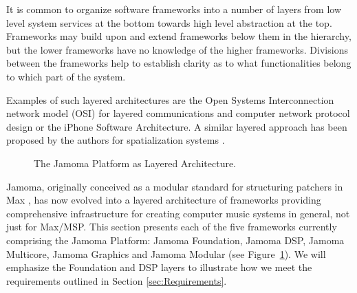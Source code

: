 \documentclass[twoside,10pt]{article}
\begin{document}
It is common to organize software frameworks into a number of layers from low level system services at the bottom towards high level abstraction at the top.  Frameworks may build upon and extend frameworks below them in the hierarchy, but the lower frameworks have no knowledge of the higher frameworks. Divisions between the frameworks help to establish clarity as to what functionalities belong to which part of the system. 

Examples of such layered architectures are the Open Systems Interconnection network model (OSI) \cite{web6} %
for layered communications and computer network protocol design or the iPhone Software Architecture. A similar layered approach has been proposed by the authors for spatialization systems \cite{Peters:2009}. 


\begin{figure}[htbp]
\centerline{}
\caption{The Jamoma Platform as Layered Architecture.}
\label{fig:layers}
\end{figure}

Jamoma, originally conceived as a modular standard for structuring patchers in Max \cite{Place:2006}, has now evolved into a layered architecture of frameworks providing comprehensive infrastructure for creating computer music systems in general, not just for Max/MSP.  This section presents each of the five frameworks currently comprising the Jamoma Platform: Jamoma Foundation, Jamoma DSP, Jamoma Multicore, Jamoma Graphics and Jamoma Modular (see Figure~\ref{fig:layers}).  We will emphasize the Foundation and DSP layers to illustrate how we meet the requirements outlined in Section \ref{sec:Requirements}.
 
  
\end{document}
